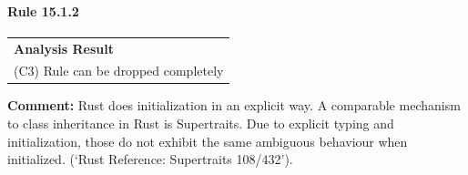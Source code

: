 \paragraph{Rule 15.1.2}
\begin{longtable}{p{13cm}}
\textbf{Analysis Result} \\
(C3) Rule can be dropped completely \\
\end{longtable}
\textbf{Comment:} Rust does initialization in an explicit way. A comparable mechanism to class inheritance in Rust is Supertraits. Due to explicit typing and initialization, those do not exhibit the same ambiguous behaviour when initialized. (`Rust Reference: Supertraits 108/432'). \\

